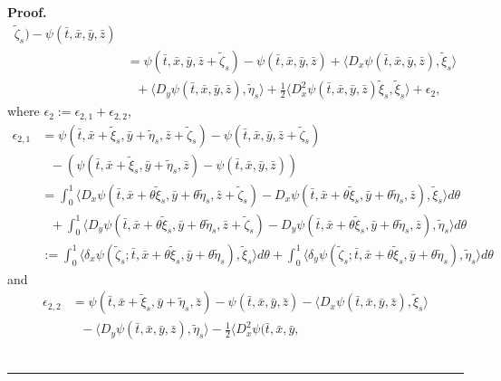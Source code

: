 \documentclass[a4paper,oneside,10pt]{article}%
\newenvironment{proof}[1][Proof]{\noindent \textbf{#1.} }{\  \rule{0.5em}{0.5em}}
\numberwithin{equation}{section}
\begin{document}
\begin{proof}
\begin{align}
\tilde{\zeta}_{s})-\psi(\bar{t},\bar{x},\bar{y},\bar{z})\nonumber \\
&  =\psi(\bar{t},\bar{x},\bar{y},\bar{z}+\tilde{\zeta}_{s})-\psi(\bar{t},\bar{
x},\bar{y},\bar{z})+\langle D_{x}\psi(\bar{t},\bar{x},\bar{y},\bar{z}),
\tilde{\xi}_{s}\rangle \label{1.4}\\
&  \text{ \  \ }+\langle D_{y}\psi(\bar{t},\bar{x},\bar{y},\bar{z}),\tilde{
\eta}_{s}\rangle+\frac{1}{2}\langle D_{x}^{2}\psi(\bar{t},\bar{x},\bar{y},
\bar{z})\tilde{\xi}_{s},\tilde{\xi}_{s}\rangle+\epsilon_{2},\nonumber
\end{align}
where $\epsilon_{2}:=\epsilon_{2,1}+\epsilon_{2,2}$,
\begin{align*}
\epsilon_{2,1}  &  =\psi(\bar{t},\bar{x}+\tilde{\xi}_{s},\bar{y}+\tilde{\eta}
_{s},\bar{z}+\tilde{\zeta}_{s})-\psi(\bar{t},\bar{x},\bar{y},\bar{z}+\tilde{
\zeta}_{s})\\
&  \text{ \  \ }-(\psi(\bar{t},\bar{x}+\tilde{\xi}_{s},\bar{y}+\tilde{\eta}
_{s},\bar{z})-\psi(\bar{t},\bar{x},\bar{y},\bar{z}))\\
&  =\int_{0}^{1}\big \langle D_{x}\psi(\bar{t},\bar{x}+\theta \tilde{\xi}%
_{s},\bar{ y}+\theta \tilde{\eta}_{s},\bar{z}+\tilde{\zeta}_{s})-D_{x}\psi
(\bar{t}, \bar{x}+\theta \tilde{\xi}_{s},\bar{y}+\theta \tilde{\eta}_{s},\bar
{z}), \tilde{\xi}_{s}\big \rangle d\theta \\
&  \text{\  \  \ }+\int_{0}^{1}\big \langle D_{y}\psi(\bar{t},\bar{x}%
+\theta \tilde{ \xi}_{s},\bar{y}+\theta \tilde{\eta}_{s},\bar{z}+\tilde{\zeta}
_{s})-D_{y}\psi(\bar{t},\bar{x}+\theta \tilde{\xi}_{s},\bar{y}+\theta \tilde{
\eta}_{s},\bar{z}),\tilde{\eta}_{s}\big \rangle d\theta \\
&  :=\int_{0}^{1}\big \langle \delta_{x}\psi(\tilde{\zeta}_{s};\bar{t},\bar
{x}+\theta \tilde{ \xi}_{s},\bar{y}+\theta \tilde{\eta}_{s}), \tilde{\xi}%
_{s}\big \rangle d\theta+ \int_{0}^{1}\big \langle \delta_{y}\psi(\tilde
{\zeta}_{s};\bar{t},\bar{x}+\theta \tilde{ \xi}_{s},\bar{y}+\theta \tilde{\eta
}_{s}), \tilde{\eta}_{s}\big \rangle d\theta
\end{align*}
and
\begin{align*}
\epsilon_{2,2}  &  =\psi(\bar{t},\bar{x}+\tilde{\xi}_{s},\bar{y}+\tilde{\eta}
_{s},\bar{z})-\psi(\bar{t},\bar{x},\bar{y},\bar{z})-\langle D_{x}\psi(\bar{ t
},\bar{x},\bar{y},\bar{z}),\tilde{\xi}_{s}\rangle \\
&  \text{\  \  \ }-\langle D_{y}\psi(\bar{t},\bar{x},\bar{y},\bar{z}),\tilde{
\eta}_{s}\rangle-\frac{1}{2}\langle D_{x}^{2}\psi(\bar{t},\bar{x},\bar{y},

\end{align*}
\end{proof}
\end{document}
